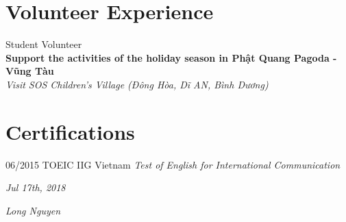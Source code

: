 \documentclass[]{friggeri-cv}
\begin{document}
\section{Volunteer Experience}
Student Volunteer\\
\textbf{Support the activities of the holiday season in Phật Quang Pagoda - Vũng Tàu}\\
\emph{Visit SOS Children's Village (Đông Hòa, Dĩ AN, Bình Dương)}
\\

\section{Certifications}
\begin{entrylist}
  \entry
    {06/2015}
    {TOEIC}
    {IIG Vietnam}
    {\emph{Test of English for International Communication}}
\end{entrylist}

\begin{flushleft}
\emph{Jul 17th, 2018}
\end{flushleft}
\begin{flushright}
\emph{Long Nguyen}
\end{flushright}
\end{document}
